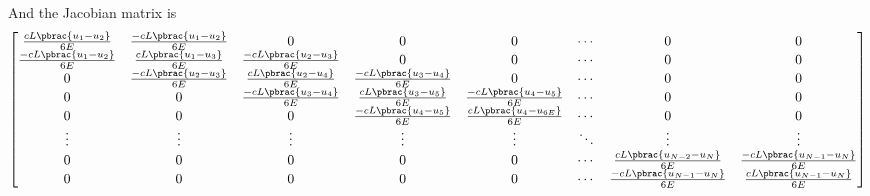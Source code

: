 And the Jacobian matrix is
\begin{equation}
  \begin{bmatrix}
    \frac{cL\pbrac{u_{1}-u_{2}}}{6E} & \frac{-cL\pbrac{u_{1}-u_{2}}}{6E} & 0 & 0 & 0 & \cdots & 0 & 0 \\
    \frac{-cL\pbrac{u_{1}-u_{2}}}{6E} & \frac{cL\pbrac{u_{1}-u_{3}}}{6E} &  \frac{-cL\pbrac{u_{2}-u_{3}}}{6E} & 0 & 0 & \cdots & 0 & 0 \\
    0 & \frac{-cL\pbrac{u_{2}-u_{3}}}{6E} & \frac{cL\pbrac{u_{2}-u_{4}}}{6E} &  \frac{-cL\pbrac{u_{3}-u_{4}}}{6E} & 0 & \cdots & 0 & 0 \\
    0 & 0 & \frac{-cL\pbrac{u_{3}-u_{4}}}{6E} & \frac{cL\pbrac{u_{3}-u_{5}}}{6E} &  \frac{-cL\pbrac{u_{4}-u_{5}}}{6E} & \cdots & 0 & 0 \\
    0 & 0 & 0 & \frac{-cL\pbrac{u_{4}-u_{5}}}{6E} & \frac{cL\pbrac{u_{4}-u_{6E}}}{6E} & \cdots & 0 & 0 \\
    \vdots & \vdots & \vdots & \vdots & \vdots & \ddots & \vdots & \vdots \\
    0 & 0 & 0 & 0 & 0 & \cdots & \frac{cL\pbrac{u_{N-2}-u_{N}}}{6E} & \frac{-cL\pbrac{u_{N-1}-u_{N}}}{6E} \\
    0 & 0 & 0 & 0 & 0 & \cdots & \frac{-cL\pbrac{u_{N-1}-u_{N}}}{6E} & \frac{cL\pbrac{u_{N-1}-u_{N}}}{6E}
  \end{bmatrix}
\end{equation}
